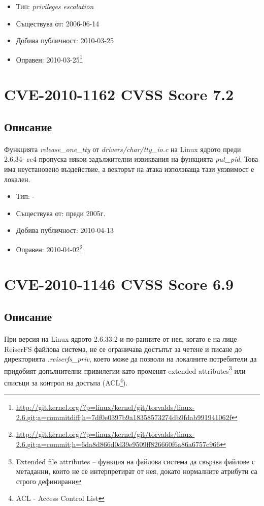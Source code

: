 \documentclass[a4paper,12pt,leqno]{article}
\begin{document}
\begin{itemize}
    \item Тип: \textit{privileges escalation}
    \item Съществува от: 2006-06-14
  	\item Добива публичност: 2010-03-25
    \item Оправен: 2010-03-25\footnote{\url{http://git.kernel.org/?p=linux/kernel/git/torvalds/linux-2.6.git;a=commitdiff;h=7df0e0397b9a18358573274db9fdab991941062f}}
\end{itemize}

\section{CVE-2010-1162 CVSS Score 7.2}
\subsection{Описание}
\paragraph{}
Функцията \textit{release\_one\_tty} от \textit{drivers/char/tty\_io.c} на Linux ядрото преди 2.6.34-
rc4 пропуска някои задължителни извиквания на функцията \textit{put\_pid}. Това има 
неустановено въздействие, а векторът на атака използваща тази уязвимост е 
локален.

\begin{itemize}
    \item Тип: -
    \item Съществува от: преди 2005г.
  	\item Добива публичност: 2010-04-13
    \item Оправен: 2010-04-02\footnote{\url{http://git.kernel.org/?p=linux/kernel/git/torvalds/linux-2.6.git;a=commit;h=6da8d866d0d39e9509ff826660f6a86a6757c966}}
\end{itemize}

\section{CVE-2010-1146 CVSS Score 6.9}
\subsection{Описание}
\paragraph{}
При версия на Linux ядрото 2.6.33.2 и по-ранните от нея, когато е на лице 
ReiserFS файлова система, не се ограничава достъпът за четене и писане до 
директорията \textit{.reiserfs\_priv}, което може да позволи на локалните потребители 
да придобият допълнителни привилегии като променят extended attributes\footnote{Extended file attributes – функция на файлова система да свързва файлове с метаданни, които 
не се интерпретират от нея, докато нормалните атрибути са строго дефинирани}
или списъци за контрол на достъпа (ACL\footnote{ACL - Access Control List}).
\end{document}
